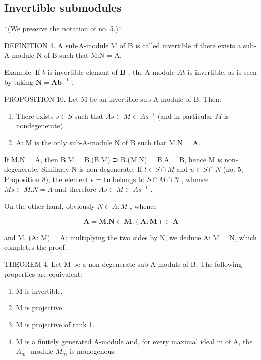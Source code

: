\subsection{Invertible submodules}

*(We preserve the notation of no. 5.)*

DEFINITION 4. A sub-A-module M of B is called invertible if there exists a sub-A-module N of B such that M.N = A.

Example. If \(b\) is invertible element of \(\mathbf{B}\) , the A-module \(Ab\) is invertible, as is seen by taking \(\mathbf{N} = \mathbf{Ab}^{-1}\) .

PROPOSITION 10. Let M be an invertible sub-A-module of B. Then:

\begin{enumerate}
\def\labelenumi{(\roman{enumi})}
\item
  There exists \(s \in S\) such that \(As \subset M \subset As^{-1}\) (and in particular \(M\) is nondegenerate).
\item
  A: M is the only sub-A-module N of B such that M.N = A.
\end{enumerate}

If M.N = A, then B.M = B.(B.M) ⊃ B.(M.N) = B.A = B, hence M is non-degenerate. Similarly N is non-degenerate. If \(t \in S \cap M\) and \(u \in S \cap N\) (no. 5, Proposition 8), the element s = tu belongs to \(S \cap M \cap N\) , whence \(Ms \subset M.N = A\) and therefore \(As \subset M \subset As^{-1}\) .

On the other hand, obviously \(N \subset A: M\) , whence

\[
\mathbf {A} = \mathbf {M}. \mathbf {N} \subset \mathbf {M}. (\mathbf {A}: \mathbf {M}) \subset \mathbf {A}
\]

and M. (A: M) = A; multiplying the two sides by N, we deduce A: M = N, which completes the proof.

THEOREM 4. Let M be a non-degenerate sub-A-module of B. The following properties are equivalent:

\begin{enumerate}
\def\labelenumi{(\alph{enumi})}
\item
  M is invertible.
\item
  M is projective.
\item
  M is projective of rank 1.
\item
  M is a finitely generated A-module and, for every maximal ideal m of A, the \(A_{m}\) -module \(M_{m}\) is monogenous.
\end{enumerate}

